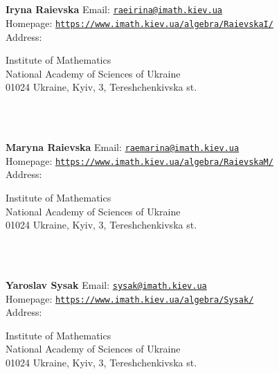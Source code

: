 \documentclass[a4paper,11pt]{report}
\begin{document}
\begin{titlepage}
\mbox{}\\
{\mbox{}\\
\small \noindent \textbf{ Iryna Raievska    }  Email: \href{mailto://raeirina@imath.kiev.ua} {\texttt{raeirina@imath.kiev.ua}}\\
  Homepage: \href{https://www.imath.kiev.ua/~algebra/Raievska_I/} {\texttt{https://www.imath.kiev.ua/\texttt{}algebra/Raievska{\textunderscore}I/}}\\
  Address: \begin{minipage}[t]{8cm}\noindent
 Institute of Mathematics\\
 National Academy of Sciences of Ukraine\\
 01024 Ukraine, Kyiv, 3, Tereshchenkivska st.\\
 \end{minipage}
}\\
{\mbox{}\\
\small \noindent \textbf{ Maryna Raievska    }  Email: \href{mailto://raemarina@imath.kiev.ua} {\texttt{raemarina@imath.kiev.ua}}\\
  Homepage: \href{https://www.imath.kiev.ua/~algebra/Raievska_M/} {\texttt{https://www.imath.kiev.ua/\texttt{}algebra/Raievska{\textunderscore}M/}}\\
  Address: \begin{minipage}[t]{8cm}\noindent
 Institute of Mathematics\\
 National Academy of Sciences of Ukraine\\
 01024 Ukraine, Kyiv, 3, Tereshchenkivska st.\\
 \end{minipage}
}\\
{\mbox{}\\
\small \noindent \textbf{ Yaroslav Sysak    }  Email: \href{mailto://sysak@imath.kiev.ua} {\texttt{sysak@imath.kiev.ua}}\\
  Homepage: \href{https://www.imath.kiev.ua/~algebra/Sysak/} {\texttt{https://www.imath.kiev.ua/\texttt{}algebra/Sysak/}}\\
  Address: \begin{minipage}[t]{8cm}\noindent
 Institute of Mathematics\\
 National Academy of Sciences of Ukraine\\
 01024 Ukraine, Kyiv, 3, Tereshchenkivska st.\\
 \end{minipage}
}\\
\end{titlepage}
\end{document}
